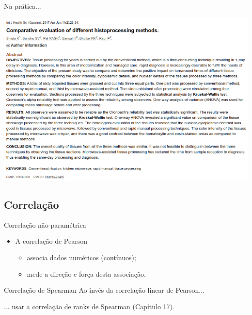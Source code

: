\documentclass{beamer}
\begin{document}
\begin{frame}{\scriptsize Na prática...}
  \begin{center}
    \includegraphics[width=\textwidth]{Cap37-38/exemplo-kw}
  \end{center}
\end{frame}

\subsection{Correlação}

\begin{frame}{\scriptsize Correlação não-paramétrica}
  \begin{itemize}
    \footnotesize
  \item A correlação de Pearson
    \begin{itemize}
      \scriptsize
    \item associa dados numéricos (contínuos);
    \item mede a direção e força desta associação.
    \end{itemize}
  \end{itemize}
  \bigskip
  \begin{block}{Correlação de Spearman}
    \footnotesize
    Ao invés da correlação linear de Pearson...

    \bigskip
    ... usar a correlação de ranks de Spearman (Capítulo 17).
  \end{block}
\end{frame}
\end{document}
